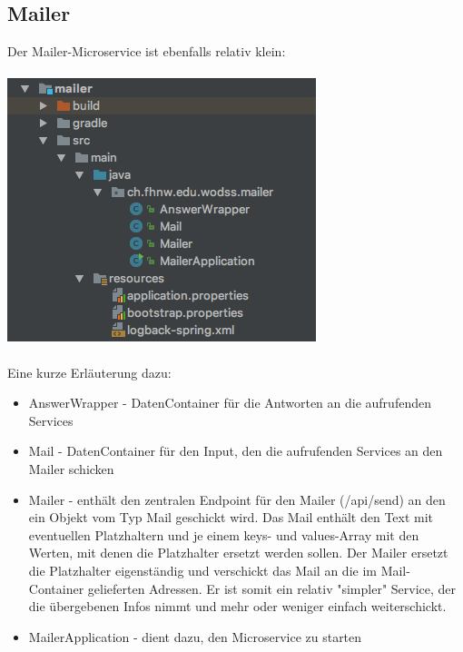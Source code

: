 \documentclass[11pt]{article} %
\begin{document}
\subsection{Mailer}
Der Mailer-Microservice ist ebenfalls relativ klein:
\\
\\
\includegraphics[scale=0.7]{structure_mailer}
\\
\\
Eine kurze Erläuterung dazu:
\begin{itemize}
\item AnswerWrapper - DatenContainer für die Antworten an die aufrufenden Services
\item Mail - DatenContainer für den Input, den die aufrufenden Services an den Mailer schicken
\item Mailer - enthält den zentralen Endpoint für den Mailer (/api/send) an den ein Objekt vom Typ Mail geschickt wird. Das Mail enthält den Text mit eventuellen Platzhaltern und je einem keys- und values-Array mit den Werten, mit denen die Platzhalter ersetzt werden sollen. Der Mailer ersetzt die Platzhalter eigenständig und verschickt das Mail an die im Mail-Container gelieferten Adressen. Er ist somit ein relativ "simpler" Service, der die übergebenen Infos nimmt und mehr oder weniger einfach weiterschickt.
\item MailerApplication - dient dazu, den Microservice zu starten
\end{itemize}
\end{document}
